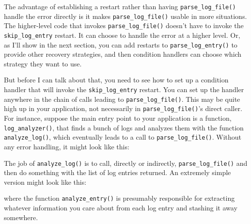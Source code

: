 The advantage of establishing a restart rather than having
\texttt{parse\_log\_file()} handle the error directly is it makes
\texttt{parse\_log\_file()} usable in more situations. The higher-level
code that invokes \texttt{parse\_log\_file()} doesn't have to invoke the
\texttt{skip\_log\_entry} restart. It can choose to handle the error at
a higher level. Or, as I'll show in the next section, you can add
restarts to \texttt{parse\_log\_entry()} to provide other recovery
strategies, and then condition handlers can choose which strategy they
want to use.

But before I can talk about that, you need to see how to set up a
condition handler that will invoke the \texttt{skip\_log\_entry}
restart. You can set up the handler anywhere in the chain of calls
leading to \texttt{parse\_log\_file()}. This may be quite high up in
your application, not necessarily in \texttt{parse\_log\_file()}'s
direct caller. For instance, suppose the main entry point to your
application is a function, \texttt{log\_analyzer()}, that finds a bunch
of logs and analyzes them with the function \texttt{analyze\_log()},
which eventually leads to a call to \texttt{parse\_log\_file()}. Without
any error handling, it might look like this:

\begin{Shaded}
\begin{Highlighting}[]
\StringTok{ }\NormalTok{() \{}
\StringTok{ }\NormalTok{()}
\NormalTok{\}}
\end{Highlighting}
\end{Shaded}

The job of \texttt{analyze\_log()} is to call, directly or indirectly,
\texttt{parse\_log\_file()} and then do something with the list of log
entries returned. An extremely simple version might look like this:

\begin{Shaded}
\begin{Highlighting}[]
\StringTok{ }
\StringTok{ }
\NormalTok{\}}
\end{Highlighting}
\end{Shaded}

where the function \texttt{analyze\_entry()} is presumably responsible
for extracting whatever information you care about from each log entry
and stashing it away somewhere.

